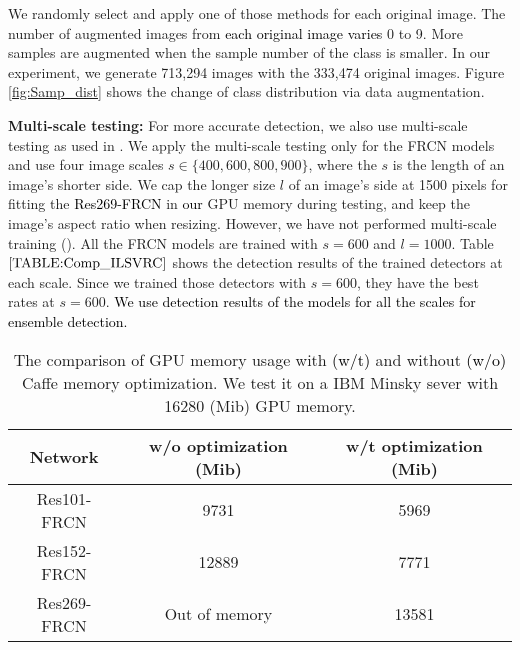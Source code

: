 \documentclass[10pt,twocolumn,letterpaper]{article}
\newcommand{\RE}{\textcolor{black}}
\newcommand{\RV}{\textcolor{black}}
\begin{document}
We randomly select and apply one of those methods for each original image. The number of augmented images from \RE{each original image varies} 0 to 9. More samples are augmented when the sample number of the class is smaller. In our experiment, we generate 713,294 images with the 333,474 original images.  Figure \ref{fig:Samp_dist} shows the change of class distribution via data augmentation.




\textbf{Multi-scale testing:}
For more accurate detection, we also use multi-scale testing as used in \cite{kaiming14ECCV, Girshick15_ICCV15, HeZRS_CVPR16}. We apply the multi-scale testing only for the FRCN models and use four image scales $s \in \{400, 600, 800, 900\}$, where the $s$ is the length of an image's shorter side. We cap the longer size $l$ of an image's side at 1500 pixels for fitting the \RV{Res269-FRCN} in \RV{our} GPU memory during testing, and keep the image's aspect ratio when resizing. However, we have not performed multi-scale training (\cf \cite{kaiming14ECCV, Girshick15_ICCV15}). All the FRCN models are trained with $s=600$ and $l=1000$. Table $\ref{TABLE:Comp_ILSVRC}$ shows the detection results of the trained detectors at each scale. Since we trained those detectors with $s=600$, they have the best rates at $s=600$. \RV{We use detection results of the models for all the scales for ensemble detection.}

\begin{table}[tbp]
\caption{{The comparison of GPU memory usage with \RV{(w/t)} and
 without \RV{(w/o)} Caffe memory optimization. We test it on a IBM Minsky sever with 16280 (Mib) GPU memory. }}  
\vspace{-5pt}
{\footnotesize
\begin{center}
\renewcommand{\tabcolsep}{1.0mm}
\begin{tabular}{c|c|c}
\hline \hline
\textbf{Network} & \textbf{w/o optimization (Mib)}   & \textbf{w/t optimization (Mib)}  \\
\hline 
Res101-FRCN & 9731 & 5969 \\
Res152-FRCN &  12889 & 7771 \\
Res269-FRCN & Out of memory & 13581\\
\hline \hline 
\end{tabular}
\end{center}}
\vspace{-5pt}
\label{TABLE:Comp_GPU}
\end{table}
\end{document}
